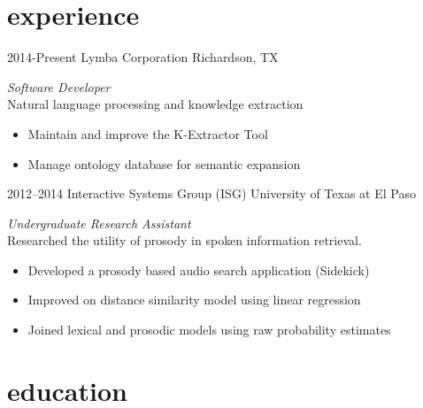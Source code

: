 \documentclass[]{friggeri-cv} %
\begin{document}
\section{experience }

\begin{entrylist}
\entry
{2014-Present}
{Lymba Corporation}
{Richardson, TX}
{\emph{Software Developer} \\
Natural language processing and knowledge extraction 
\begin{itemize}
\item 
Maintain and improve the K-Extractor Tool
\end{itemize}
\begin{itemize}
\item Manage ontology database for semantic expansion
\end{itemize}}
\entry
{2012--2014}
{Interactive Systems Group  {\normalfont (ISG)}}
{University of Texas at El Paso}
{\emph{Undergraduate Research Assistant} \\
Researched the utility of prosody in spoken information retrieval.
\begin{itemize}
\item %
Developed a prosody based audio search application (Sidekick)
\end{itemize}
\begin{itemize}
\item Improved on distance similarity model using linear regression
\end{itemize}
\begin{itemize}
\item Joined lexical and prosodic models using raw probability estimates
\end{itemize}}
\end{entrylist}



\section{education}
\end{document}
